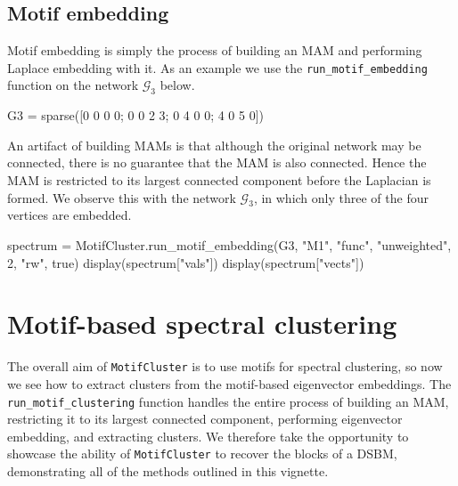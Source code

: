 \documentclass{article}
\begin{document}
\subsection{Motif embedding}

Motif embedding is simply the process of building an MAM
and performing Laplace embedding with it.
As an example we use the
\texttt{run\_motif\_embedding}
function on the network $\mathcal{G}_3$ below.

\begin{tcolorbox}[colback=black!5!white,colframe=black!15!white]
\begin{juliablock}
G3 = sparse([0 0 0 0; 0 0 2 3; 0 4 0 0; 4 0 5 0])
\end{juliablock}
\end{tcolorbox}

An artifact of building MAMs is that although the original network may
be connected, there is no guarantee that the MAM is also connected.
Hence the MAM is restricted to its largest connected component
before the Laplacian is formed.
We observe this with the network $\mathcal{G}_3$,
in which only three of the four vertices are embedded.

\begin{tcolorbox}[colback=black!5!white,colframe=black!15!white]
\begin{juliablock}
spectrum = MotifCluster.run_motif_embedding(G3, "M1", "func",
                                            "unweighted", 2, "rw", true)
display(spectrum["vals"])
display(spectrum["vects"])
\end{juliablock}
\texttt{\obeylines\printpythontex}
\end{tcolorbox}




\section{Motif-based spectral clustering}

The overall aim of \texttt{MotifCluster} is to use motifs for spectral clustering,
so now we see how to extract clusters from the motif-based
eigenvector embeddings.
The \texttt{run\_motif\_clustering} function handles the entire process of
building an MAM, restricting it to its largest connected component,
performing eigenvector embedding, and extracting clusters.
We therefore take the opportunity to showcase the ability of
\texttt{MotifCluster} to recover the blocks of a DSBM,
demonstrating all of the methods outlined in this vignette.\\
\end{document}
